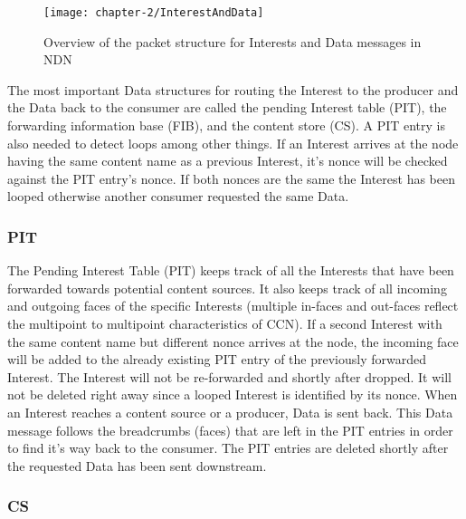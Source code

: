 \vspace{5mm} %

\begin{figure}[H]
  \centering
  \texttt{[image: chapter-2/InterestAndData]}
  \caption{Overview of the packet structure for Interests and Data messages in NDN \cite{ndnWiki}}
  \label{fig:InterestAndData}
\end{figure}

\vspace{5mm} %

The most important Data structures for routing the Interest to the producer and the Data back to the consumer are called the pending Interest table (PIT), the forwarding information base (FIB), and the content store (CS). A PIT entry is also needed to detect loops among other things. If an Interest arrives at the node having the same content name as a previous Interest, it's nonce will be checked against the PIT entry's nonce. If both nonces are the same the Interest has been looped otherwise another consumer requested the same Data.

\subsubsection{PIT}

The Pending Interest Table (PIT) keeps track of all the Interests that have been forwarded towards potential content sources. It also keeps track of all incoming and outgoing faces of the specific Interests (multiple in-faces and out-faces reflect the multipoint to multipoint characteristics of CCN). If a second Interest with the same content name but different nonce arrives at the node, the incoming face will be added to the already existing PIT entry of the previously forwarded Interest. The Interest will not be re-forwarded and shortly after dropped. It will not be deleted right away since a looped Interest is identified by its nonce. When an Interest reaches a content source or a producer, Data is sent back.  This Data message follows the breadcrumbs (faces) that are left in the PIT entries in order to find it's way back to the consumer. The PIT entries are deleted shortly after the requested Data has been sent downstream.

\subsubsection{CS} 

